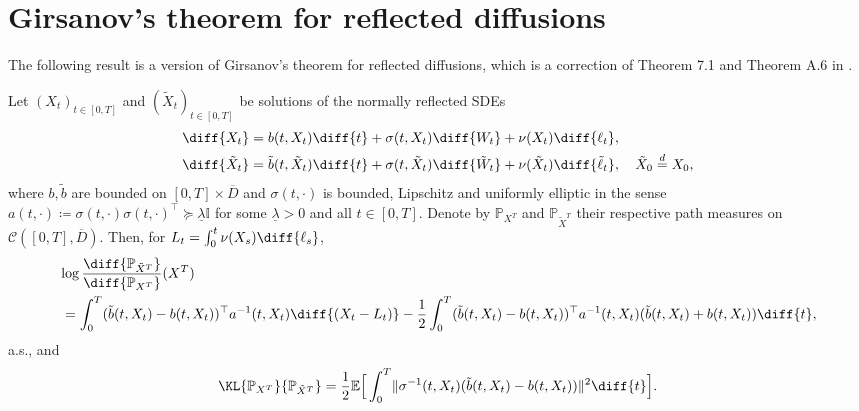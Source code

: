 \documentclass[a4paper, 11pt, headings = small, abstract]{scrartcl}
\begin{document}
\section{Girsanov's theorem for reflected diffusions}
The following result is a version of Girsanov's theorem for reflected diffusions, which is a correction of Theorem 7.1 and Theorem A.6 in \cite{lou23}.
\begin{theorem}\label{theo:girsa}
	\label{girsanov}
	Let $(X_t)_{t \in [0,T]}$ and $(\tilde{X}_t)_{t \in [0,T]}$ be solutions of the normally reflected SDEs 
	\begin{align} 
		\diff{X_t}
		&=b(t,X_t) \diff{t} + \sigma(t,X_t) \diff{W_t} + \nu(X_t)\diff{\ell_t},\notag \\ 
		\diff{\tilde{X}_t} 
		&= \tilde{b}(t,\tilde{X}_t) \diff{t} + \sigma(t,\tilde{X}_t) \diff{\tilde{W}_t} +  \nu(\tilde{X}_t)\diff{\tilde{\ell}_t}, \quad \tilde{X}_0 \overset{d}{=} X_0, \label{eq:girsa2}
	\end{align}
	where $b, \tilde{b}$ are bounded on $[0,T] \times \overline{D}$ and  $\sigma(t,\cdot)$ is bounded, Lipschitz and uniformly elliptic in the sense $a(t,\cdot) \coloneqq \sigma(t,\cdot)\sigma(t,\cdot)^\top \succeq \underline{\lambda} \mathbb{I}$ for some $\underline{\lambda} > 0$ and all $t \in [0,T]$. 
    Denote by $\mathbb{P}_{X^T}$ and $\mathbb{P}_{\tilde{X}^T}$ their respective path measures on $\mathcal{C}([0,T], \overline{D})$.
	Then, for $L_t = \int_0^{t} \nu(X_s) \diff{\ell_s}$,
	\begin{align*} 
		&\log \frac{\diff{\mathbb{P}_{\tilde{X}^T}}}{\diff{\mathbb{P}_{X^T}}}(X^T)\\ 
		&\,= \int_0^T (\tilde{b}(t,X_t) - b(t,X_t))^\top a^{-1}(t,X_t) \diff{(X_t-L_t)} - \frac{1}{2} \int_0^T (\tilde{b}(t,X_t) - b(t,X_t))^\top a^{-1}(t,X_t)(\tilde{b}(t,X_t) + b(t,X_t)) \diff{t},
	\end{align*}
	a.s., and 
	\[
		\KL{\mathbb{P}_{X^T}}{\mathbb{P}_{\tilde{X}^T}}
		= \frac{1}{2} \mathbb{E}\Big[\int_0^T \lVert \sigma^{-1}(t,X_t) (\tilde{b}(t,X_t) - b(t,X_t)) \rVert^2 \diff{t}\Big].
	\]
\end{theorem}
\end{document}
